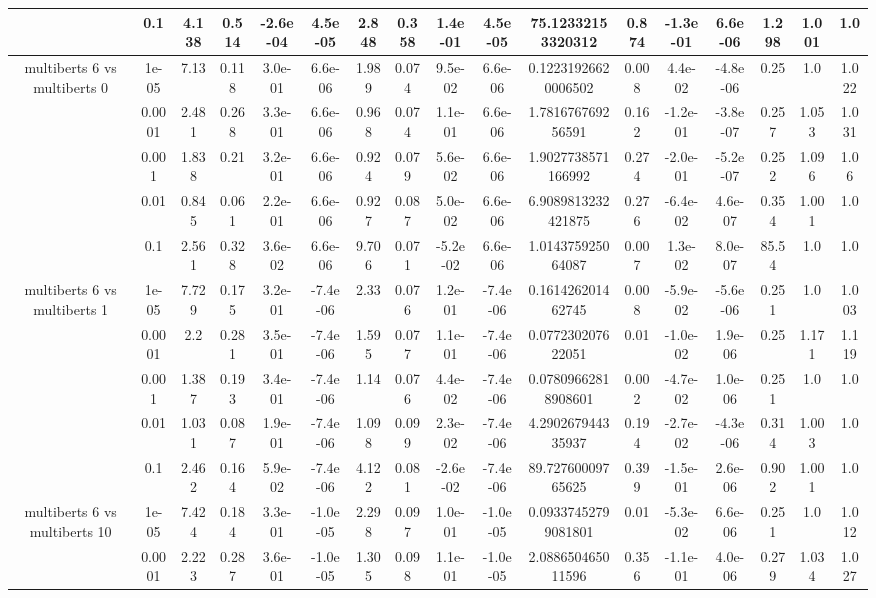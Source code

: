 \begin{tabular}{|c|c|c|c|c|c|c|c|c|c|c|c|c|c|c|c|c|}
 & 0.1 & 4.138 & 0.514 & -2.6e-04 & 4.5e-05 & 2.848 & 0.358 & 1.4e-01 & 4.5e-05 & 75.12332153320312 & 0.874 & -1.3e-01 & 6.6e-06 & 1.298 & 1.001 & 1.0 \\
\hline
\multirow{5}{*}{multiberts 6 vs multiberts 0} & 1e-05 & 7.13 & 0.118 & 3.0e-01 & 6.6e-06 & 1.989 & 0.074 & 9.5e-02 & 6.6e-06 & 0.12231926620006502 & 0.008 & 4.4e-02 & -4.8e-06 & 0.25 & 1.0 & 1.022 \\
 & 0.0001 & 2.481 & 0.268 & 3.3e-01 & 6.6e-06 & 0.968 & 0.074 & 1.1e-01 & 6.6e-06 & 1.781676769256591 & 0.162 & -1.2e-01 & -3.8e-07 & 0.257 & 1.053 & 1.031 \\
 & 0.001 & 1.838 & 0.21 & 3.2e-01 & 6.6e-06 & 0.924 & 0.079 & 5.6e-02 & 6.6e-06 & 1.9027738571166992 & 0.274 & -2.0e-01 & -5.2e-07 & 0.252 & 1.096 & 1.06 \\
 & 0.01 & 0.845 & 0.061 & 2.2e-01 & 6.6e-06 & 0.927 & 0.087 & 5.0e-02 & 6.6e-06 & 6.9089813232421875 & 0.276 & -6.4e-02 & 4.6e-07 & 0.354 & 1.001 & 1.0 \\
 & 0.1 & 2.561 & 0.328 & 3.6e-02 & 6.6e-06 & 9.706 & 0.071 & -5.2e-02 & 6.6e-06 & 1.014375925064087 & 0.007 & 1.3e-02 & 8.0e-07 & 85.54 & 1.0 & 1.0 \\
\hline
\multirow{5}{*}{multiberts 6 vs multiberts 1} & 1e-05 & 7.729 & 0.175 & 3.2e-01 & -7.4e-06 & 2.33 & 0.076 & 1.2e-01 & -7.4e-06 & 0.161426201462745 & 0.008 & -5.9e-02 & -5.6e-06 & 0.251 & 1.0 & 1.003 \\
 & 0.0001 & 2.2 & 0.281 & 3.5e-01 & -7.4e-06 & 1.595 & 0.077 & 1.1e-01 & -7.4e-06 & 0.077230207622051 & 0.01 & -1.0e-02 & 1.9e-06 & 0.25 & 1.171 & 1.119 \\
 & 0.001 & 1.387 & 0.193 & 3.4e-01 & -7.4e-06 & 1.14 & 0.076 & 4.4e-02 & -7.4e-06 & 0.07809662818908601 & 0.002 & -4.7e-02 & 1.0e-06 & 0.251 & 1.0 & 1.0 \\
 & 0.01 & 1.031 & 0.087 & 1.9e-01 & -7.4e-06 & 1.098 & 0.099 & 2.3e-02 & -7.4e-06 & 4.290267944335937 & 0.194 & -2.7e-02 & -4.3e-06 & 0.314 & 1.003 & 1.0 \\
 & 0.1 & 2.462 & 0.164 & 5.9e-02 & -7.4e-06 & 4.122 & 0.081 & -2.6e-02 & -7.4e-06 & 89.72760009765625 & 0.399 & -1.5e-01 & 2.6e-06 & 0.902 & 1.001 & 1.0 \\
\hline
\multirow{5}{*}{multiberts 6 vs multiberts 10} & 1e-05 & 7.424 & 0.184 & 3.3e-01 & -1.0e-05 & 2.298 & 0.097 & 1.0e-01 & -1.0e-05 & 0.09337452799081801 & 0.01 & -5.3e-02 & 6.6e-06 & 0.251 & 1.0 & 1.012 \\
 & 0.0001 & 2.223 & 0.287 & 3.6e-01 & -1.0e-05 & 1.305 & 0.098 & 1.1e-01 & -1.0e-05 & 2.088650465011596 & 0.356 & -1.1e-01 & 4.0e-06 & 0.279 & 1.034 & 1.027 \\

\end{tabular}
